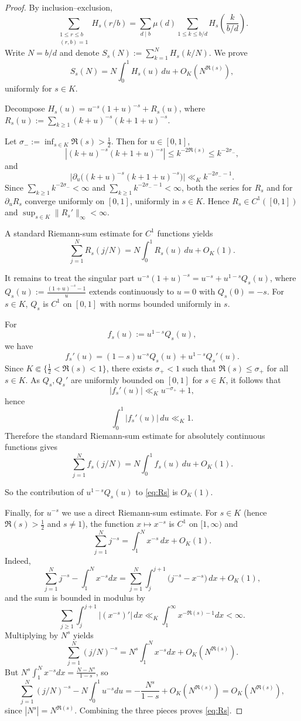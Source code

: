 \documentclass[a4paper,american,11pt]{amsart}
\theoremstyle{plain}
\theoremstyle{definition}
\begin{document}
\begin{proof}
By inclusion--exclusion,
\[
\sum_{\substack{1\le r\le b\\(r,b)=1}} H_s(r/b)
=
\sum_{d\mid b}\mu(d)\sum_{1\le k\le b/d} H_s\!\left(\frac{k}{b/d}\right).
\]
Write $N=b/d$ and denote $S_s(N):=\sum_{k=1}^N H_s(k/N)$.
We prove
\begin{equation}
\label{eq:Rs}
S_s(N)=N\int_0^1 H_s(u)\,du+O_K(N^{\Re(s)}),
\end{equation}
uniformly for $s\in K$.

Decompose $H_s(u)=u^{-s}(1+u)^{-s}+R_s(u)$, where
\(R_s(u):=\sum_{k\ge1}(k+u)^{-s}(k+1+u)^{-s}\).

Let \(\sigma_-:=\inf_{s\in K}\Re(s)>\tfrac12\). Then for \(u\in[0,1]\),
\[
|(k+u)^{-s}(k+1+u)^{-s}|\le k^{-2\Re(s)}\le k^{-2\sigma_-},
\]
and
\[
\bigl|\partial_u\bigl((k+u)^{-s}(k+1+u)^{-s}\bigr)\bigr|
\ll_K k^{-2\sigma_--1}.
\]
Since \(\sum_{k\ge1}k^{-2\sigma_-}<\infty\) and
\(\sum_{k\ge1}k^{-2\sigma_--1}<\infty\), both the series for \(R_s\) and for
\(\partial_u R_s\) converge uniformly on \([0,1]\), uniformly in \(s\in K\).
Hence \(R_s\in C^1([0,1])\) and \(\sup_{s\in K}\|R_s'\|_\infty<\infty\).

A standard Riemann-sum estimate for $C^1$ functions yields
\[
\sum_{j=1}^N R_s(j/N)=N\int_0^1 R_s(u)\,du+O_K(1).
\]

It remains to treat the singular part \(u^{-s}(1+u)^{-s}=u^{-s}+u^{1-s}Q_s(u)\), where
\(Q_s(u):=\frac{(1+u)^{-s}-1}{u}\)
extends continuously to $u=0$ with $Q_s(0)=-s$.
For $s\in K$, $Q_s$ is $C^1$ on $[0,1]$ with norms bounded uniformly in $s$.

For
\[
f_s(u):=u^{1-s}Q_s(u),
\]
we have
\[
f_s'(u)=(1-s)u^{-s}Q_s(u)+u^{1-s}Q_s'(u).
\]
Since \(K\Subset\{\tfrac12<\Re(s)<1\}\), there exists \(\sigma_+<1\) such that
\(\Re(s)\le \sigma_+\) for all \(s\in K\). As \(Q_s,Q_s'\) are uniformly bounded on
\([0,1]\) for \(s\in K\), it follows that
\[
|f_s'(u)|\ll_K u^{-\sigma_+}+1,
\]
hence
\[
\int_0^1 |f_s'(u)|\,du \ll_K 1.
\]
Therefore the standard Riemann-sum estimate for absolutely continuous functions gives
\[
\sum_{j=1}^N f_s(j/N)
=
N\int_0^1 f_s(u)\,du+O_K(1).
\]

So the contribution of $u^{1-s}Q_s(u)$ to \eqref{eq:Rs} is $O_K(1)$.

Finally, for $u^{-s}$ we use a direct Riemann-sum estimate.
For $s\in K$ (hence $\Re(s)>\tfrac12$ and $s\neq1$), the function $x\mapsto x^{-s}$ is $C^1$ on $[1,\infty)$ and
\[
\sum_{j=1}^N j^{-s}=\int_1^N x^{-s}\,dx+O_K(1).
\]
Indeed,
\[
\sum_{j=1}^N j^{-s}-\int_1^N x^{-s}dx
=\sum_{j=1}^N\int_j^{j+1}\bigl(j^{-s}-x^{-s}\bigr)\,dx+O_K(1),
\]
and the sum is bounded in modulus by
\[\sum_{j\ge1}\int_j^{j+1}|(x^{-s})'|\,dx\ll_K\int_1^{\infty} x^{-\Re(s)-1}dx<\infty.\]
Multiplying by $N^{s}$ yields
\[
\sum_{j=1}^N (j/N)^{-s}=N^{s}\int_1^N x^{-s}dx+O_K(N^{\Re(s)}).
\]
But
\(N^{s}\int_1^N x^{-s}dx=\frac{N-N^{s}}{1-s}\), so
\[
\sum_{j=1}^N (j/N)^{-s}-N\int_0^1 u^{-s}du
=-\frac{N^{s}}{1-s}+O_K(N^{\Re(s)})
=O_K(N^{\Re(s)}),
\]
since $|N^{s}|=N^{\Re(s)}$.
Combining the three pieces proves \eqref{eq:Rs}.


\end{proof}
\end{document}
